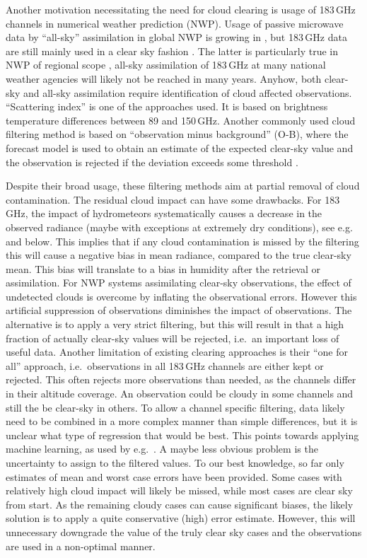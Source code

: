 \documentclass[amt, manuscript]{copernicus}
\begin{document}
Another motivation necessitating the need for cloud clearing is usage of 183\,GHz channels in 
numerical weather prediction (NWP). Usage of passive microwave data by
``all-sky'' assimilation in global NWP is growing in \citep{geer2017growing},
but 183\,GHz data are still mainly used in a clear sky fashion
\citep{geer2018all}. The latter is particularly true in NWP of regional scope
\citep{gustafsson2018survey}, all-sky assimilation of 183\,GHz at many national
weather agencies will likely not be reached in many years. Anyhow, both clear-sky and all-sky assimilation require identification of cloud affected observations. ``Scattering index'' \cite{geer2015scatteringindex} is one of the approaches used. It is based on brightness temperature differences between 89 and 150\,GHz. Another commonly used cloud filtering method is based on ``observation minus background'' (O-B), where the forecast model is used to obtain an estimate of the expected clear-sky value and the observation is rejected if the deviation exceeds some threshold \citep{English1999clouddetection}. 

Despite their broad usage, these filtering methods aim at partial removal of cloud contamination. The residual cloud impact can have some drawbacks. For 183\,GHz, the impact of hydrometeors systematically causes a decrease in the observed radiance (maybe with exceptions at extremely dry conditions), see
e.g.\ \citet{barlakas:three:20} and below. This implies that if any cloud contamination is missed by the filtering this will cause a negative bias in mean radiance, compared to the true clear-sky mean. This bias will translate to a bias in humidity after the retrieval or assimilation. For NWP systems assimilating clear-sky observations, the effect of undetected clouds is overcome by inflating the observational errors. However this artificial suppression of observations diminishes the impact of observations.  The alternative is to apply a very strict filtering, but this will result in that a high fraction of
actually clear-sky values will be rejected, i.e.\ an important loss of useful data. Another limitation of existing clearing approaches is their ``one for all'' approach, i.e.\ observations in all 183\,GHz channels are either kept or rejected. This often rejects more observations than needed, as the channels differ in their altitude coverage. An observation could be cloudy in some channels and still the be clear-sky in others. To allow a channel specific filtering, data likely need to be combined in a more complex manner than simple differences, but it is unclear what type of regression that would be best. This points towards applying machine learning, as used by e.g.\ \citet{favrichon2019detecting}. A maybe less obvious problem is the uncertainty to assign to the filtered values. To our best knowledge, so far only estimates of mean and worst case errors have been provided. Some cases with relatively high cloud impact will likely be missed, while most cases are clear sky from start. As the remaining cloudy cases can cause significant biases, the likely solution is to apply a quite conservative (high) error estimate. However, this will unnecessary downgrade the value of the truly clear sky cases and the observations are used in a non-optimal manner.
\end{document}
